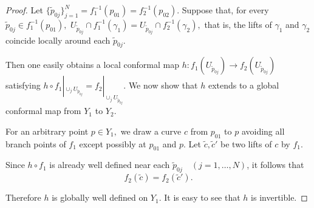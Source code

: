 \documentclass[11pt]{article}
\numberwithin{equation}{section}
\theoremstyle{plain}
\begin{document}
\begin{proof}
Let
$\{\tilde p_{0j}\}_{j=1}^{N}
=
f_{1}^{-1}(p_{01})
=
f_{2}^{-1}(p_{02}).
$ Suppose that, for every
$\tilde p_{0j}\in f_{1}^{-1}(p_{01}),
$
 $U_{\tilde p_{0j}}\cap f_{1}^{-1}(\gamma_{1})
=
U_{\tilde p_{0j}}\cap f_{2}^{-1}(\gamma_{2}),
$ that is, the lifts of \(\gamma_{1}\) and \(\gamma_{2}\) coincide locally around each  
$\tilde p_{0j}$.

Then one easily obtains a local conformal map
$h:f_{1}(U_{\tilde p_{0j}})\to f_{2}(U_{\tilde p_{0j}})
$ satisfying
$h\circ f_{1}|_{\cup_{j}U_{\tilde p_{0j}}}
=
f_{2}|_{\cup_{j}U_{\tilde p_{0j}}}.
$
We now show that $h$ extends to a global conformal map from
\(Y_{1}\) to \(Y_{2}\).

For an arbitrary point
$p\in Y_{1},
$
we draw a curve
$c
$ from
$p_{01}
$ to \(p\) avoiding all branch points of \(f_{1}\) except possibly at
$p_{01}
$ and \(p\).
Let
$\tilde c,\tilde c'
$ be two lifts of \(c\) by \(f_{1}\).

Since $h\circ f_1$ is already well defined near each  
$\tilde p_{0j}
\quad (j=1,\dots,N)$,
it follows that
$$f_{2}(\tilde c)=f_{2}(\tilde c').
$$

Therefore  \(h\) is globally well defined on \(Y_{1}\).
It is easy to see that \(h\) is invertible.
\end{proof}
\end{document}
